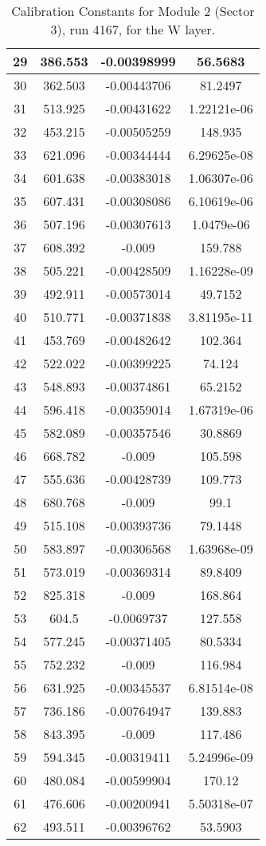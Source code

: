 \begin{table}[h]
{\begin{tabular}{|c|c|c|c|}
29	&	386.553	&	-0.00398999	&	56.5683	\\	\hline
30	&	362.503	&	-0.00443706	&	81.2497	\\	\hline
31	&	513.925	&	-0.00431622	&	1.22121e-06	\\	\hline
32	&	453.215	&	-0.00505259	&	148.935	\\	\hline
33	&	621.096	&	-0.00344444	&	6.29625e-08	\\	\hline
34	&	601.638	&	-0.00383018	&	1.06307e-06	\\	\hline
35	&	607.431	&	-0.00308086	&	6.10619e-06	\\	\hline
36	&	507.196	&	-0.00307613	&	1.0479e-06	\\	\hline
37	&	608.392	&	-0.009	&	159.788	\\	\hline
38	&	505.221	&	-0.00428509	&	1.16228e-09	\\	\hline
39	&	492.911	&	-0.00573014	&	49.7152	\\	\hline
40	&	510.771	&	-0.00371838	&	3.81195e-11	\\	\hline
41	&	453.769	&	-0.00482642	&	102.364	\\	\hline
42	&	522.022	&	-0.00399225	&	74.124	\\	\hline
43	&	548.893	&	-0.00374861	&	65.2152	\\	\hline
44	&	596.418	&	-0.00359014	&	1.67319e-06	\\	\hline
45	&	582.089	&	-0.00357546	&	30.8869	\\	\hline
46	&	668.782	&	-0.009	&	105.598	\\	\hline
47	&	555.636	&	-0.00428739	&	109.773	\\	\hline
48	&	680.768	&	-0.009	&	99.1	\\	\hline
49	&	515.108	&	-0.00393736	&	79.1448	\\	\hline
50	&	583.897	&	-0.00306568	&	1.63968e-09	\\	\hline
51	&	573.019	&	-0.00369314	&	89.8409	\\	\hline
52	&	825.318	&	-0.009	&	168.864	\\	\hline
53	&	604.5	&	-0.0069737	&	127.558	\\	\hline
54	&	577.245	&	-0.00371405	&	80.5334	\\	\hline
55	&	752.232	&	-0.009	&	116.984	\\	\hline
56	&	631.925	&	-0.00345537	&	6.81514e-08	\\	\hline
57	&	736.186	&	-0.00764947	&	139.883	\\	\hline
58	&	843.395	&	-0.009	&	117.486	\\	\hline
59	&	594.345	&	-0.00319411	&	5.24996e-09	\\	\hline
60	&	480.084	&	-0.00599904	&	170.12	\\	\hline
61	&	476.606	&	-0.00200941	&	5.50318e-07	\\	\hline
62	&	493.511	&	-0.00396762	&	53.5903	\\	\hline
  \end{tabular}
        }
        \caption{Calibration Constants for Module 2 (Sector 3), run 4167, for the W layer.}
\end{table}


